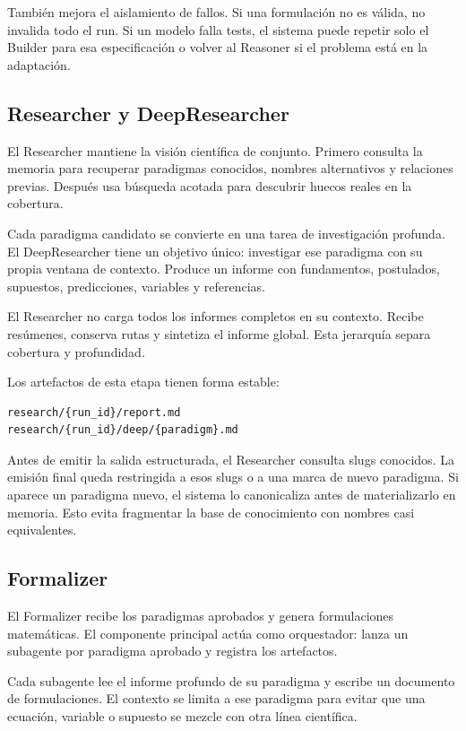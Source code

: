 También mejora el aislamiento de fallos. Si una formulación no es válida, no
invalida todo el run. Si un modelo falla tests, el sistema puede repetir solo el
Builder para esa especificación o volver al Reasoner si el problema está en la
adaptación.

\subsection{Researcher y DeepResearcher}

El Researcher mantiene la visión científica de conjunto. Primero consulta la
memoria para recuperar paradigmas conocidos, nombres alternativos y relaciones
previas. Después usa búsqueda acotada para descubrir huecos reales en la
cobertura.

Cada paradigma candidato se convierte en una tarea de investigación profunda.
El DeepResearcher tiene un objetivo único: investigar ese paradigma con su
propia ventana de contexto. Produce un informe con fundamentos, postulados,
supuestos, predicciones, variables y referencias.

El Researcher no carga todos los informes completos en su contexto. Recibe
resúmenes, conserva rutas y sintetiza el informe global. Esta jerarquía separa
cobertura y profundidad.

Los artefactos de esta etapa tienen forma estable:

\begin{verbatim}
research/{run_id}/report.md
research/{run_id}/deep/{paradigm}.md
\end{verbatim}

Antes de emitir la salida estructurada, el Researcher consulta slugs conocidos.
La emisión final queda restringida a esos slugs o a una marca de nuevo
paradigma. Si aparece un paradigma nuevo, el sistema lo canonicaliza antes de
materializarlo en memoria. Esto evita fragmentar la base de conocimiento con
nombres casi equivalentes.

\subsection{Formalizer}

El Formalizer recibe los paradigmas aprobados y genera formulaciones
matemáticas. El componente principal actúa como orquestador: lanza un subagente
por paradigma aprobado y registra los artefactos.

Cada subagente lee el informe profundo de su paradigma y escribe un documento
de formulaciones. El contexto se limita a ese paradigma para evitar que una
ecuación, variable o supuesto se mezcle con otra línea científica.


